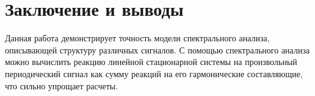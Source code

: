 \section*{Заключение и выводы}

Данная работа демонстрирует точность модели спектрального анализа, описывающей структуру различных сигналов. С помощью спектрального анализа можно вычислить реакцию линейной стационарной системы на произвольный периодический сигнал как сумму реакций на его гармонические составляющие, что сильно упрощает расчеты.